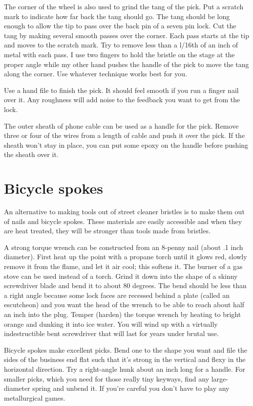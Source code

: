 The corner of the wheel is also used to grind the tang of the pick. Put a scratch mark 
to indicate how far back the tang should go. The tang should be long enough to allow the 
tip to pass over the back pin of a seven pin lock. Cut the tang by making several smooth 
passes over the corner. Each pass starts at the tip and moves to the scratch mark. Try to 
remove less than a l/16th of an inch of metal with each pass. I use two fingers to hold the 
bristle on the stage at the proper angle while my other hand pushes the handle of the pick 
to move the tang along the corner. Use whatever technique works best for you. 

Use a hand file to finish the pick. It should feel smooth if you run a finger nail over it. 
Any roughness will add noise to the feedback you want to get from the lock. 

The outer sheath of phone cable can be used as a handle for the pick. Remove three or 
four of the wires from a length of cable and push it over the pick. If the sheath won't stay 
in place, you can put some epoxy on the handle before pushing the sheath over it. 

\section{Bicycle spokes}
An alternative to making tools out of street cleaner bristles is to make them out of nails and 
bicycle spokes. These materials are easily accessible and when they are heat treated, they 
will be stronger than tools made from bristles. 

A strong torque wrench can be constructed from an 8-penny nail (about .1 inch diameter). 
First heat up the point with a propane torch until it glows red, slowly remove it from the
flame, and let it air cool; this softens it. The burner of a gas stove can be used instead of 
a torch. Grind it down into the shape of a skinny screwdriver blade and bend it to about 
80 degrees. The bend should be less than a right angle because some lock faces are recessed 
behind a plate (called an escutcheon) and you want the head of the wrench to be able to 
reach about half an inch into the plug. Temper (harden) the torque wrench by heating to 
bright orange and dunking it into ice water. You will wind up with a virtually indestructible 
bent screwdriver that will last for years under brutal use. 

Bicycle spokes make excellent picks. Bend one to the shape you want and file the sides of 
the business end flat such that it's strong in the vertical and flexy in the horizontal direction. 
Try a right-angle hunk about an inch long for a handle. For smaller picks, which you need 
for those really tiny keyways, find any large-diameter spring and unbend it. If you're careful 
you don't have to play any metallurgical games.


